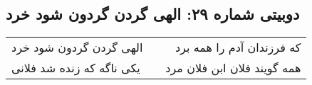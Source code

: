 \begin{center}
\section*{دوبیتی شماره ۲۹: الهی گردن گردون شود خرد}
\label{sec:029}
\begin{longtable}{l p{0.5cm} r}
الهی گردن گردون شود خرد
&&
که فرزندان آدم را همه برد
\\
یکی ناگه که زنده شد فلانی
&&
همه گویند فلان ابن فلان مرد
\\
\end{longtable}
\end{center}
